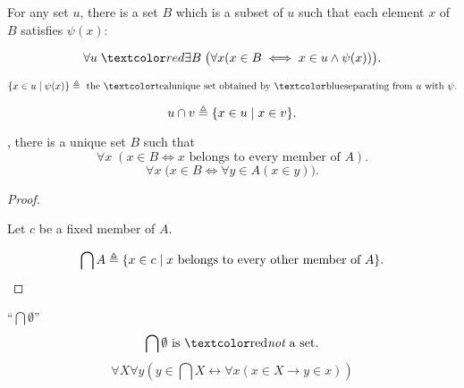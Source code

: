 \begin{frame}{}
  \begin{axiom}
    For any set $u$, there is a set $B$
    which is a subset of $u$ such that each element $x$ of $B$ satisfies $\psi(x)$:

    \[
      \forall u\; \red{\exists B}\; \big( \forall x (x \in B \iff x \in u \land \psi(x)) \big).
    \]
  \end{axiom}

  \begin{definition}
    \[
      \set{x \in u \mid \psi(x)} \triangleq \text{ the \teal{unique} set obtained by \blue{separating} from } u \text{ with } \psi.
    \]
  \end{definition}

  \pause
  \begin{definition}[``$u \cap v$'']
    \[
      u \cap v \triangleq \{x \in u \mid x \in v\}.
    \]
  \end{definition}
\end{frame}

\begin{frame}{}
  \begin{theorem}
    , there is a unique set $B$ such that
    \[
      \forall x\; (x \in B \iff x \text{ belongs to every member of } A).
    \]
    \[
      \forall x\; \big(x \in B \iff \forall y \in A (x \in y) \big).
    \]
  \end{theorem}

  \pause
  \begin{proof}
    \begin{center}
      Let $c$ be a fixed member of $A$.
    \end{center}

    \pause
    \vspace{-0.50cm}
    \[
      \bigcap A \triangleq \{x \in c \mid x \text{ belongs to every other member of } A\}.
    \]
  \end{proof}

  \pause
  \begin{alertblock}{``$\bigcap \emptyset$''}
    \pause  
    \[
      \bigcap \emptyset \text{ is \red{\it not} a set}.
    \]
    \pause
    \[
	    \forall X\forall y\left(y\in\bigcap X\leftrightarrow\forall x\left(x\in X\rightarrow y\in x\right)\right)
    \]
  \end{alertblock}
\end{frame}

